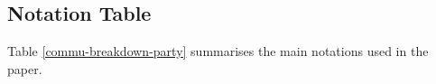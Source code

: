 

\subsection{Notation Table}\label{sec::notation-table}
Table \ref{commu-breakdown-party} summarises the main notations used in the paper. 



\begin{table}[!h]
\begin{scriptsize}
\begin{center}
\footnotesize{
\vspace{-6mm}
\caption{ \small{Notation Table}.}\label{commu-breakdown-party} 
\renewcommand{\arraystretch}{.9}
}
\end{center}
\end{scriptsize}
\end{table}
